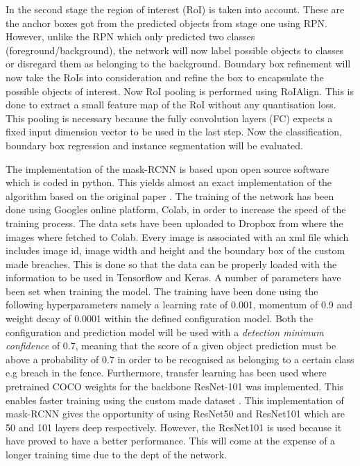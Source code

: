 \documentclass[../Head/Main.tex]{subfiles}
\begin{document}
In the second stage the region of interest (RoI) is taken into account. These are the anchor boxes got from the predicted objects from stage one using RPN. However, unlike the RPN which only predicted two classes (foreground/background), the network will now  label possible objects to classes or disregard them as belonging to the background. Boundary box refinement will now take the RoIs into consideration and refine the box to encapsulate the possible objects of interest. Now RoI pooling is performed using RoIAlign. This is done to extract a small feature map of the RoI without any quantisation loss. This pooling is necessary because the fully convolution layers (FC) expects a fixed input dimension vector to be used in the last step. Now the classification, boundary box regression and instance segmentation will be evaluated. \cite{MaskRCNNStructure} \cite{InstanceSegmentation}   

The implementation of the mask-RCNN is based upon open source software \cite{matterportMaskrcnn2017} which is coded in python. This yields almost an exact implementation of the algorithm based on the original paper \cite{MaskRCNN}. The training of the network has been done using Googles online platform, Colab, in order to increase the speed of the training process. The data sets have been uploaded to Dropbox from where the images where fetched to Colab. Every image is associated with an xml file which includes image id, image width and height and the boundary box of the custom made breaches. This is done so that the data can be properly  loaded with the information to be used in Tensorflow and Keras. A number of parameters have been set when training the model. The training have been done using the following hyperparameters namely a learning rate of 0.001, momentum of 0.9 and weight decay of 0.0001 within the defined configuration model. Both the configuration and prediction model will be used with a \textit{detection minimum confidence} of 0.7, meaning that the score of a given object prediction must be above a probability of 0.7 in order to be recognised as belonging to a certain class e.g breach in the fence. Furthermore, transfer learning has been used where pretrained COCO weights for the backbone ResNet-101 was implemented. This enables faster training using the custom made dataset \cite{cocoWeights}. This implementation of mask-RCNN gives the opportunity of using ResNet50 and ResNet101 which are 50 and 101 layers deep respectively. However, the ResNet101 is used because it have proved to have a better performance. This will come at the expense of a longer training time due to the dept of the network. \cite{trainClassifier}
\end{document}
